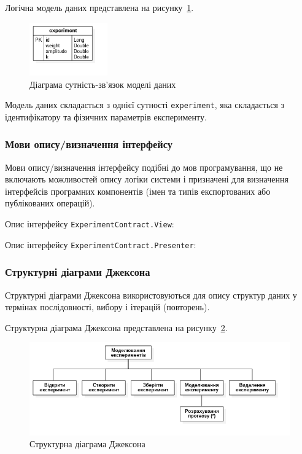 Логічна модель даних представлена на рисунку~\ref{fig:erd}.

\begin{figure}[H]
  \centering
    \includegraphics[width=0.3\textwidth]{erd}
  \caption{Діаграма сутність-зв’язок моделі даних}
  \label{fig:erd}
\end{figure}

Модель даних складається з однієї сутності \texttt{experiment}, яка складається з ідентифікатору та фізичних параметрів експерименту.

\subsubsection{Мови опису/визначення інтерфейсу}
Мови опису/визначення інтерфейсу подібні до мов програмування, що не включають можливостей опису логіки системи і призначені для визначення інтерфейсів програмних компонентів (імен та типів експортованих або публікованих операцій).

Опис інтерфейсу \texttt{ExperimentContract.View}:


Опис інтерфейсу \texttt{ExperimentContract.Presenter}:


\subsubsection{Структурні діаграми Джексона}
Структурні діаграми Джексона використовуються для опису структур даних у термінах послідовності, вибору і ітерацій (повторень).

Структурна діаграма Джексона представлена на рисунку~\ref{fig:jackson_structure}.

\begin{figure}[H]
  \centering
    \includegraphics[width=1\textwidth]{jackson_structure}
  \caption{Структурна діаграма Джексона}
  \label{fig:jackson_structure}
\end{figure}

